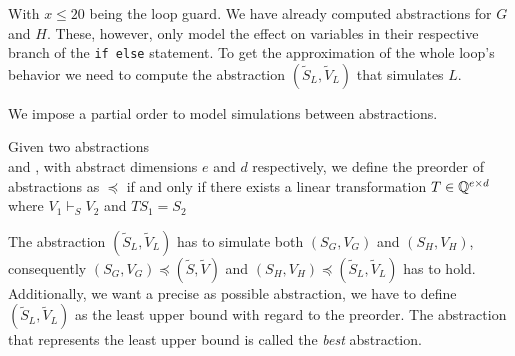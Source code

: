 With $x \leq 20$ being the loop guard. We have already computed \qvasr abstractions for $G$ and $H$. These, however, only model the effect on variables in their respective branch of the \texttt{if else} statement. To get the approximation of the whole loop's behavior we need to compute the \qvasr abstraction $(\tilde{S}_L, \tilde{V}_L)$ that simulates $L$. \\ \par We impose a partial order to model simulations between \qvasr abstractions.
\begin{mydef}
	Given two \qvasr abstractions \\  and , with abstract dimensions $e$ and $d$ respectively, we define the preorder of \qvasr abstractions as  $\preceq$  if and only if there exists a linear transformation $T \in  \mathbb{Q} ^{e \times d}$ where $V_1 \vdash_S V_2$ and $TS_1 = S_2$
\end{mydef}
The \qvasr abstraction $(\tilde{S}_L, \tilde{V}_L)$ has to simulate both $(S_G, V_G)$ and $(S_H, V_H)$, consequently $(S_G, V_G) \preceq (\tilde{S}, \tilde{V})$ and $(S_H, V_H) \preceq (\tilde{S}_L, \tilde{V}_L)$ has to hold. Additionally, we want a precise as possible \qvasr abstraction, we have to define $(\tilde{S}_L, \tilde{V}_L)$ as the least upper bound with regard to the preorder. The \qvasr abstraction that represents the least upper bound is called the \textsl{best} \qvasr abstraction. \par

